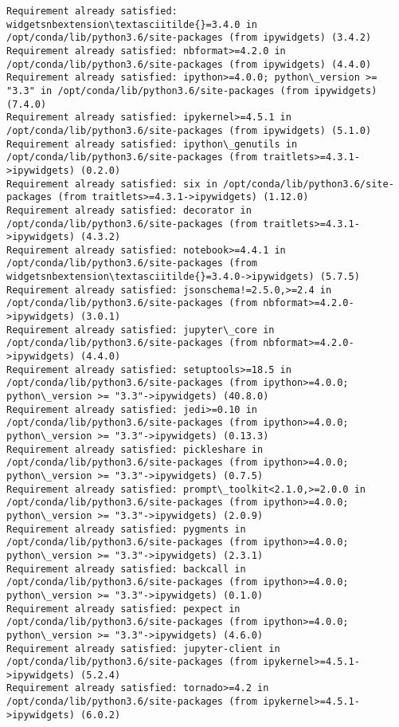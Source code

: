 \documentclass[11pt]{article}
\begin{document}
\begin{Verbatim}[commandchars=\\\{\}]
Requirement already satisfied: widgetsnbextension\textasciitilde{}=3.4.0 in /opt/conda/lib/python3.6/site-packages (from ipywidgets) (3.4.2)
Requirement already satisfied: nbformat>=4.2.0 in /opt/conda/lib/python3.6/site-packages (from ipywidgets) (4.4.0)
Requirement already satisfied: ipython>=4.0.0; python\_version >= "3.3" in /opt/conda/lib/python3.6/site-packages (from ipywidgets) (7.4.0)
Requirement already satisfied: ipykernel>=4.5.1 in /opt/conda/lib/python3.6/site-packages (from ipywidgets) (5.1.0)
Requirement already satisfied: ipython\_genutils in /opt/conda/lib/python3.6/site-packages (from traitlets>=4.3.1->ipywidgets) (0.2.0)
Requirement already satisfied: six in /opt/conda/lib/python3.6/site-packages (from traitlets>=4.3.1->ipywidgets) (1.12.0)
Requirement already satisfied: decorator in /opt/conda/lib/python3.6/site-packages (from traitlets>=4.3.1->ipywidgets) (4.3.2)
Requirement already satisfied: notebook>=4.4.1 in /opt/conda/lib/python3.6/site-packages (from widgetsnbextension\textasciitilde{}=3.4.0->ipywidgets) (5.7.5)
Requirement already satisfied: jsonschema!=2.5.0,>=2.4 in /opt/conda/lib/python3.6/site-packages (from nbformat>=4.2.0->ipywidgets) (3.0.1)
Requirement already satisfied: jupyter\_core in /opt/conda/lib/python3.6/site-packages (from nbformat>=4.2.0->ipywidgets) (4.4.0)
Requirement already satisfied: setuptools>=18.5 in /opt/conda/lib/python3.6/site-packages (from ipython>=4.0.0; python\_version >= "3.3"->ipywidgets) (40.8.0)
Requirement already satisfied: jedi>=0.10 in /opt/conda/lib/python3.6/site-packages (from ipython>=4.0.0; python\_version >= "3.3"->ipywidgets) (0.13.3)
Requirement already satisfied: pickleshare in /opt/conda/lib/python3.6/site-packages (from ipython>=4.0.0; python\_version >= "3.3"->ipywidgets) (0.7.5)
Requirement already satisfied: prompt\_toolkit<2.1.0,>=2.0.0 in /opt/conda/lib/python3.6/site-packages (from ipython>=4.0.0; python\_version >= "3.3"->ipywidgets) (2.0.9)
Requirement already satisfied: pygments in /opt/conda/lib/python3.6/site-packages (from ipython>=4.0.0; python\_version >= "3.3"->ipywidgets) (2.3.1)
Requirement already satisfied: backcall in /opt/conda/lib/python3.6/site-packages (from ipython>=4.0.0; python\_version >= "3.3"->ipywidgets) (0.1.0)
Requirement already satisfied: pexpect in /opt/conda/lib/python3.6/site-packages (from ipython>=4.0.0; python\_version >= "3.3"->ipywidgets) (4.6.0)
Requirement already satisfied: jupyter-client in /opt/conda/lib/python3.6/site-packages (from ipykernel>=4.5.1->ipywidgets) (5.2.4)
Requirement already satisfied: tornado>=4.2 in /opt/conda/lib/python3.6/site-packages (from ipykernel>=4.5.1->ipywidgets) (6.0.2)

\end{Verbatim}
\end{document}
